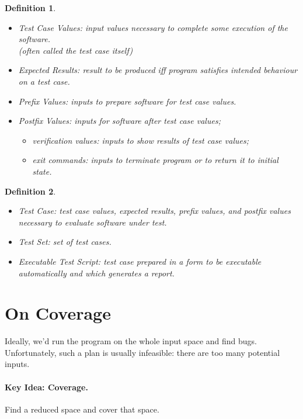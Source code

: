 \documentclass[11pt]{article}
\newtheorem{defn}{Definition}
\begin{document}
\begin{defn} ~\\[-2em]

\begin{itemize} 
\item \emph{Test Case Values}: input values necessary to complete some execution of the software.\\
  (often called the test case itself)
\item \emph{Expected Results}: result to be produced iff program satisfies intended behaviour on a test case.
\item \emph{Prefix Values}: inputs to prepare software for test case values.
\item \emph{Postfix Values}: inputs for software after test case values;
\begin{itemize}
\item \emph{verification values}: inputs to show results of test case values;
\item \emph{exit commands}: inputs to terminate program or to return it to initial state.
\end{itemize}
\end{itemize}
\end{defn}

\begin{defn} ~\\[-2em]

\begin{itemize}
\item \emph{Test Case}: test case values, expected results, prefix values, and postfix values necessary to evaluate software under test.
\item \emph{Test Set}: set of test cases.
\item \emph{Executable Test Script}: test case prepared in a form to be executable automatically and which generates a report.
\end{itemize}
\end{defn}

\section*{On Coverage}
Ideally, we'd run the program on the whole input space and find bugs. 
Unfortunately, such a plan is usually infeasible: there are too many potential
inputs. 

\paragraph{Key Idea: Coverage.} Find a reduced space and cover that space. 
\end{document}
